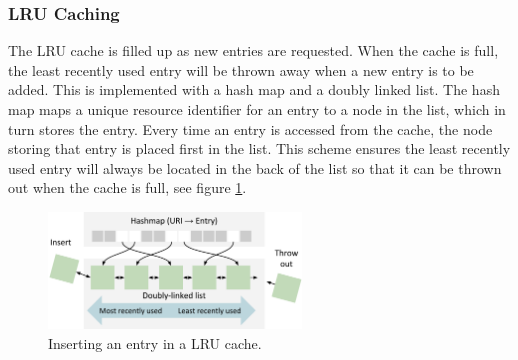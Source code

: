 \subsubsection{LRU Caching}
\label{section:lrucaching}
The LRU cache is filled up as new entries are requested. When the cache is full, the least recently used entry will be thrown away when a new entry is to be added. This is implemented with a hash map and a doubly linked list. The hash map maps a unique resource identifier for an entry to a node in the list, which in turn stores the entry. Every time an entry is accessed from the cache, the node storing that entry is placed first in the list. This scheme ensures the least recently used entry will always be located in the back of the list so that it can be thrown out when the cache is full, see figure \ref{fig:lrucache}.

\begin{figure}[htbp]
    \centering
    \includegraphics[width=0.6\textwidth]{figures/lru_cache.pdf}
    \caption{Inserting an entry in a LRU cache.}
    \label{fig:lrucache}
\end{figure}